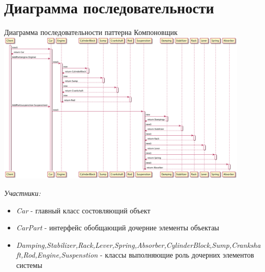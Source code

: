 \documentclass[PI,LAB]{HSEUniversity}
\begin{document}
\section{Диаграмма последовательности }

\begin{FIGURE}[h]{Диаграмма последовательности паттерна Компоновщик\label{fig:example-figure}}
    \includegraphics[width=0.9\textwidth]{../out/diagrams/builder-seq/compactor-seq}
\end{FIGURE}
\emph{Участники:}
\begin{itemize}
    \item \emph{Car} - главный класс состовляющий объект
    \item \emph{CarPart} - интерфейс обобщающий дочерние элементы объектаы
    \item \emph{Damping,Stabilizer,Rack,Lever,Spring,Absorber,CylinderBlock,Sump,Crankshaft,Rod,Engine,Suspenstion} - классы выполняющие роль дочерних элементов системы
\end{itemize}
\end{document}
